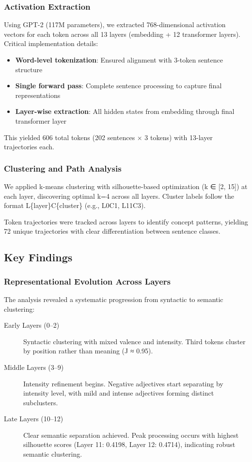 \subsubsection{Activation Extraction}

Using GPT-2 (117M parameters), we extracted 768-dimensional activation vectors for each token across all 13 layers (embedding + 12 transformer layers). Critical implementation details:

\begin{itemize}
    \item \textbf{Word-level tokenization}: Ensured alignment with 3-token sentence structure
    \item \textbf{Single forward pass}: Complete sentence processing to capture final representations
    \item \textbf{Layer-wise extraction}: All hidden states from embedding through final transformer layer
\end{itemize}

This yielded 606 total tokens (202 sentences × 3 tokens) with 13-layer trajectories each.

\subsubsection{Clustering and Path Analysis}

We applied k-means clustering with silhouette-based optimization (k ∈ [2, 15]) at each layer, discovering optimal k=4 across all layers. Cluster labels follow the format L\{layer\}C\{cluster\} (e.g., L0C1, L11C3).

Token trajectories were tracked across layers to identify concept patterns, yielding 72 unique trajectories with clear differentiation between sentence classes.

\subsection{Key Findings}

\subsubsection{Representational Evolution Across Layers}

The analysis revealed a systematic progression from syntactic to semantic clustering:

\begin{description}
    \item[Early Layers (0--2)] Syntactic clustering with mixed valence and intensity. Third tokens cluster by position rather than meaning (J ≈ 0.95).
    
    \item[Middle Layers (3--9)] Intensity refinement begins. Negative adjectives start separating by intensity level, with mild and intense adjectives forming distinct subclusters.
    
    \item[Late Layers (10--12)] Clear semantic separation achieved. Peak processing occurs with highest silhouette scores (Layer 11: 0.4198, Layer 12: 0.4714), indicating robust semantic clustering.
\end{description}

